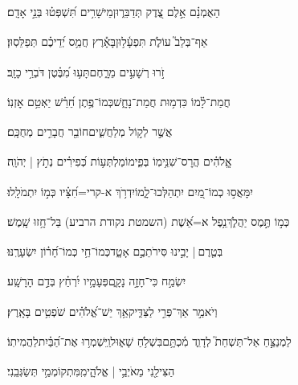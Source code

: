 \documentclass[12pt]{article}
\newcommand{\loc}[1]{\textsuperscript{\locf{#1}}}
\begin{document}
{\loc{ ב}~}‏הַאֻמְנָ֗ם אֵ֣לֶם צֶ֭דֶק תְּדַבֵּר֑וּן{\hfill}מֵישָׁרִ֥ים תִּ֝שְׁפְּט֗וּ בְּנֵ֣י אָדָֽם׃\par

{\loc{ ג}~}‏אַף־בְּלֵב֮ עוֹלֹ֢ת תִּפְעָ֫ל֥וּן{\hfill}בָּאָ֡רֶץ חֲמַ֥ס יְ֝דֵיכֶ֗ם תְּפַלֵּסֽוּן׃\par

{\loc{ ד}~}‏זֹ֣רוּ רְשָׁעִ֣ים מֵרָ֑חֶם{\hfill}תָּע֥וּ מִ֝בֶּ֗טֶן דֹּבְרֵ֥י כָזָֽב׃\par

{\loc{ ה}~}‏חֲמַת־לָ֗מוֹ כִּדְמ֥וּת חֲמַת־נָחָ֑שׁ{\hfill}כְּמוֹ־פֶ֥תֶן חֵ֝רֵ֗שׁ יַאְטֵ֥ם אׇזְנֽוֹ׃\par

{\loc{ ו}~}‏אֲשֶׁ֣ר  לְק֣וֹל מְלַחֲשִׁ֑ים{\hfill}חוֹבֵ֖ר חֲבָרִ֣ים מְחֻכָּֽם׃\par

{\loc{ ז}~}‏אֱֽלֹהִ֗ים הֲרׇס־שִׁנֵּ֥ימֽוֹ בְּפִ֑ימוֹ{\hfill}מַלְתְּע֥וֹת כְּ֝פִירִ֗ים נְתֹ֣ץ | יְהֹוָֽה׃\par

{\loc{ ח}~}‏יִמָּאֲס֣וּ כְמוֹ־מַ֭יִם יִתְהַלְּכוּ־לָ֑מוֹ{\hfill}יִדְרֹ֥ךְ א-קרי=חִ֝צָּ֗יו כְּמ֣וֹ יִתְמֹלָֽלוּ׃\par

{\loc{ ט}~}‏כְּמ֣וֹ  תֶּ֣מֶס יַהֲלֹ֑ךְ{\hfill}נֵ֥פֶל א=אֵ֝שֶׁת (השמטת נקודת הרביע) בַּל־חָ֥זוּ שָֽׁמֶשׁ׃\par

{\loc{ י}~}‏בְּטֶ֤רֶם |  יָבִ֣ינוּ סִּירֹתֵכֶ֣ם אָטָ֑ד{\hfill}כְּמוֹ־חַ֥י כְּמוֹ־חָ֝ר֗וֹן יִשְׂעָרֶֽנּוּ׃\par

{\loc{ יא}~}‏יִשְׂמַ֣ח  כִּי־חָזָ֣ה נָקָ֑ם{\hfill}פְּעָמָ֥יו יִ֝רְחַ֗ץ בְּדַ֣ם הָרָשָֽׁע׃\par

{\loc{ יב}~}‏וְיֹאמַ֣ר  אַךְ־פְּרִ֣י לַצַּדִּ֑יק{\hfill}אַ֥ךְ יֵשׁ־אֱ֝לֹהִ֗ים שֹׁפְטִ֥ים בָּאָֽרֶץ׃\par\pend
\ledpb
\pstart[\subsection*{\textcolor{red}{פרק נט}}]\label{פרק נט}
{\loc{ א}~}‏לַמְנַצֵּ֣חַ אַל־תַּשְׁחֵת֮ לְדָוִ֢ד מִ֫כְתָּ֥ם\newline\hspace*{.5em}בִּשְׁלֹ֥חַ שָׁא֑וּל{\hfill}וַֽיִּשְׁמְר֥וּ אֶת־הַ֝בַּ֗יִת\hspace{1em}לַהֲמִיתֽוֹ׃\par

{\loc{ ב}~}‏הַצִּילֵ֖נִי מֵאֹיְבַ֥י | אֱלֹהָ֑י{\hfill}מִֽמִּתְקוֹמְמַ֥י תְּשַׂגְּבֵֽנִי׃\par
\end{document}
